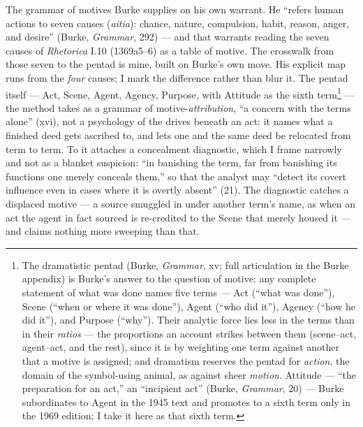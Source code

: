 \documentclass{article}
\begin{document}
The grammar of motives Burke supplies on his own warrant. He ``refers human actions to seven causes (\textit{aitia}): chance, nature, compulsion, habit, reason, anger, and desire'' (Burke, \textit{Grammar}, 292) — and that warrants reading the seven causes of \textit{Rhetorica} I.10 (1369a5–6) as a table of motive. The crosswalk from those seven to the pentad is mine, built on Burke's own move. His explicit map runs from the \textit{four} causes; I mark the difference rather than blur it. The pentad itself — Act, Scene, Agent, Agency, Purpose, with Attitude as the sixth term\footnote{The dramatistic pentad (Burke, \textit{Grammar}, xv; full articulation in the Burke appendix) is Burke's answer to the question of motive: any complete statement of what was done names five terms — Act (``what was done''), Scene (``when or where it was done''), Agent (``who did it''), Agency (``how he did it''), and Purpose (``why''). Their analytic force lies less in the terms than in their \textit{ratios} — the proportions an account strikes between them (scene–act, agent–act, and the rest), since it is by weighting one term against another that a motive is assigned; and dramatism reserves the pentad for \textit{action}, the domain of the symbol-using animal, as against sheer \textit{motion}. Attitude — ``the preparation for an act,'' an ``incipient act'' (Burke, \textit{Grammar}, 20) — Burke subordinates to Agent in the 1945 text and promotes to a sixth term only in the 1969 edition; I take it here as that sixth term.} — the method takes as a grammar of motive-\textit{attribution}, ``a concern with the terms alone'' (xvi), not a psychology of the drives beneath an act: it names what a finished deed gets ascribed to, and lets one and the same deed be relocated from term to term. To it attaches a concealment diagnostic, which I frame narrowly and not as a blanket suspicion: ``in banishing the term, far from banishing its functions one merely conceals them,'' so that the analyst may ``detect its covert influence even in cases where it is overtly absent'' (21). The diagnostic catches a displaced motive — a source smuggled in under another term's name, as when an act the agent in fact sourced is re-credited to the Scene that merely housed it — and claims nothing more sweeping than that.
\end{document}
